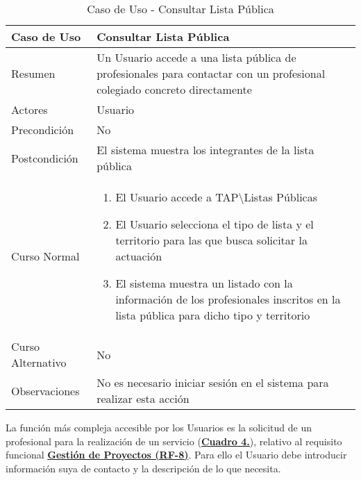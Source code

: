 \begin{table}[!htbp]
  \centering  \addtocounter{casouso}{1}
  \begin{tabular}{|l | p{100mm}|}
    \textbf{Caso de Uso}  & \textbf{Consultar Lista Pública} \\ \hline
    Resumen 			 & Un Usuario accede a una lista pública de profesionales para contactar con un profesional colegiado concreto directamente \\ \hline
    Actores  		 & Usuario \\ \hline
    Precondición  	 & No \\ \hline
    Postcondición  	 & El sistema muestra los integrantes de la lista pública \\ \hline
    Curso Normal   	 & \begin{enumerate}
	  \item El Usuario accede a TAP\textbackslash Listas Públicas
	  \item El Usuario selecciona el tipo de lista y el territorio para las que busca solicitar la actuación
	  \item El sistema muestra un listado con la información de los profesionales inscritos en la lista pública para dicho tipo y territorio
    \end{enumerate}  \\ \hline
    Curso Alternativo  & No  \\ \hline
    Observaciones 	 & No es necesario iniciar sesión en el sistema para realizar esta acción  \\ \hline
  \end{tabular}
  \caption{Caso de Uso  - Consultar Lista Pública}
  \label{tab:cuuConsultaLstPub}
\end{table}
\FloatBarrier

\addtocounter{tabla}{1}
La función más compleja accesible por los Usuarios es la solicitud de un profesional para la realización de un servicio (\textbf{\hyperref[tab:cuuRegPeticProf]{Cuadro 4.}}), relativo al requisito funcional \textbf{\hyperref[tab:rfGestProyectos]{Gestión de Proyectos (RF-8)}}. Para ello el Usuario debe introducir información suya de contacto y la descripción de lo que necesita. 

